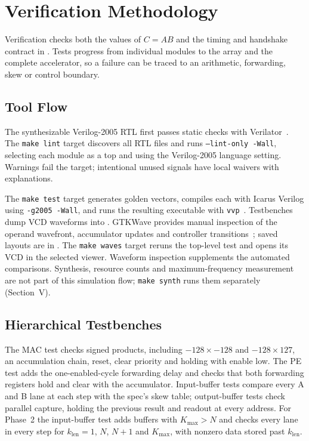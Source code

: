 
\section{Verification Methodology}
Verification checks both the values of $C=AB$ and the timing and handshake
contract in . Tests progress from individual modules to
the array and the complete accelerator, so a failure can be traced to an
arithmetic, forwarding, skew or control boundary.

\subsection{Tool Flow}
The synthesizable Verilog-2005 RTL first passes static checks with
Verilator~\cite{verilator2026guide}. The \texttt{make lint} target discovers all
RTL files and runs \texttt{--lint-only -Wall}, selecting each module as a
top and using the Verilog-2005 language setting. Warnings fail the target;
intentional unused signals have local waivers with explanations.

The \texttt{make test} target generates golden vectors, compiles each
 with Icarus Verilog using \texttt{-g2005 -Wall}, and runs
the resulting executable with \texttt{vvp}~\cite{icarus2026simulation}.
Testbenches dump VCD waveforms into . GTKWave provides manual
inspection of the operand wavefront, accumulator updates and controller
transitions~\cite{gtkwave2026docs}; saved layouts are in .
The \texttt{make waves} target reruns the top-level test and opens its VCD
in the selected viewer. Waveform inspection supplements the automated
comparisons. Synthesis, resource counts and maximum-frequency measurement
are not part of this simulation flow; \texttt{make synth} runs them
separately (Section~V).

\subsection{Hierarchical Testbenches}
The MAC test checks signed products, including $-128\times-128$ and
$-128\times127$, an accumulation chain, reset, clear priority and holding
with enable low. The PE test adds the one-enabled-cycle forwarding delay
and checks that both forwarding registers hold and clear with the
accumulator. Input-buffer tests compare every A and B lane at each step
with the spec's skew table; output-buffer tests check parallel capture,
holding the previous result and readout at every address. For Phase~2 the
input-buffer test adds buffers with $K_{\max} > N$ and checks every lane in
every step for $k_{\mathrm{len}} = 1$, $N$, $N+1$ and $K_{\max}$, with nonzero
data stored past $k_{\mathrm{len}}$.

